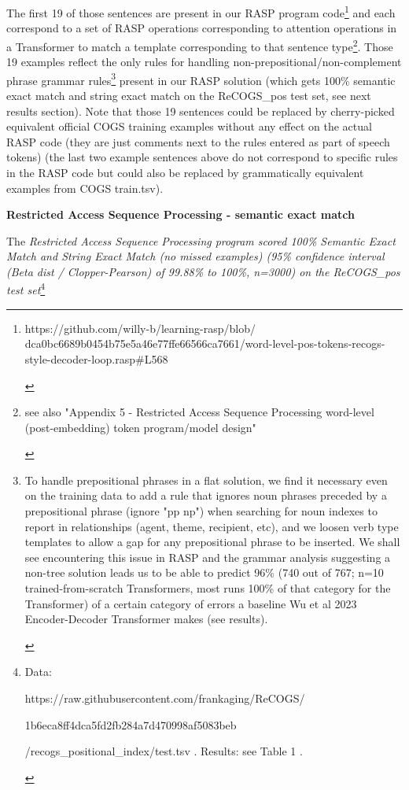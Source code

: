 \documentclass[11pt]{article}
\begin{document}
The first 19 of those sentences are present in our RASP program code\footnote{
\begin{tiny}
https://github.com/willy-b/learning-rasp/blob/
dca0bc6689b0454b75e5a46e77ffe66566ca7661/word-level-pos-tokens-recogs-style-decoder-loop.rasp\#L568\end{tiny}}
and each correspond to a set of RASP operations corresponding to attention operations in a Transformer to match a template corresponding to that sentence type\footnote{
\begin{tiny}
see also "Appendix 5 - Restricted Access Sequence Processing word-level (post-embedding) token program/model design"
\end{tiny}
}. Those 19 examples reflect the only rules for handling non-prepositional/non-complement phrase grammar rules\footnote{
\begin{tiny}
To handle prepositional phrases in a flat solution, we find it necessary even on the training data to add a rule that ignores noun phrases preceded by a prepositional phrase (ignore "pp np") when searching for noun indexes to report in relationships (agent, theme, recipient, etc), and we loosen verb type templates to allow a gap for any prepositional phrase to be inserted. We shall see encountering this issue in RASP and the grammar analysis suggesting a non-tree solution leads us to be able to predict 96\% (740 out of 767; n=10 trained-from-scratch Transformers, most runs 100\% of that category for the Transformer) of a certain category of errors a baseline Wu et al 2023 Encoder-Decoder Transformer makes (see results).
\end{tiny}
} present in our RASP solution (which gets 100\% semantic exact match and string exact match on the \cite{Wu2023} ReCOGS\_pos test set, see next results section). Note that those 19 sentences could be replaced by cherry-picked equivalent official COGS training examples without any effect on the actual RASP code (they are just comments next to the rules entered as part of speech tokens) (the last two example sentences above do not correspond to specific rules in the RASP code but could also be replaced by grammatically equivalent examples from COGS train.tsv).

\textbf{ Restricted Access Sequence Processing - semantic exact match}

The \textit{Restricted Access Sequence Processing program scored 100\% Semantic Exact Match and String Exact Match (no missed examples) (95\% confidence interval (Beta dist / Clopper-Pearson) of 99.88\% to 100\%, n=3000) on the ReCOGS\_pos test set}\footnote{ 
\begin{tiny}
Data: 

https://raw.githubusercontent.com/frankaging/ReCOGS/

1b6eca8ff4dca5fd2fb284a7d470998af5083beb

/recogs\_positional\_index/test.tsv . Results: see Table 1 .
\end{tiny}
} 
\end{document}
